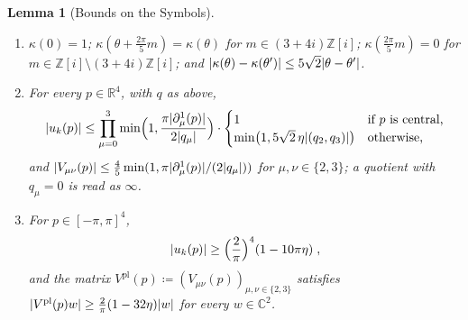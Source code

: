 \documentclass[11pt]{preprint}
\DeclarePairedDelimiter{\abs}{\lvert}{\rvert}
\numberwithin{equation}{section}
\newtheorem{lemma}[theorem]{Lemma}
\theoremstyle{definition}
\theoremstyle{remark}
\theoremstyle{plain}
\begin{document}
\begin{lemma}[Bounds on the Symbols]\label{lem:symbol-bounds}
\begin{enumerate}[label=(\roman*)]
\item $\kappa(0) = 1$; $\kappa(\theta + \frac{2\pi}{5}m) = \kappa(\theta)$ for $m \in (3 + 4i)\mathbb Z[i]$; $\kappa(\frac{2\pi}{5}m) = 0$ for $m \in \mathbb Z[i] \setminus (3 + 4i)\mathbb Z[i]$; and $\abs{\kappa(\theta) - \kappa(\theta')} \leq 5\sqrt2\abs{\theta - \theta'}$.
\item For every $p \in \mathbb R^4$, with $q$ as above,
\begin{equation}\label{eq:u-bound}
    \abs{u_k(p)} \leq \prod_{\mu=0}^{3}\min\Bigl(1, \frac{\pi\abs{\partial^1_\mu(p)}}{2\abs{q_\mu}}\Bigr) \cdot \begin{cases} 1 & \text{if } p \text{ is central,}\\ \min\bigl(1, 5\sqrt2\,\eta\abs{(q_2, q_3)}\bigr) & \text{otherwise,} \end{cases}
\end{equation}
and $\abs{V_{\mu\nu}(p)} \leq \frac45\min(1, \pi\abs{\partial^1_\mu(p)}/(2\abs{q_\mu}))$ for $\mu, \nu \in \{ 2, 3 \}$; a quotient with $q_\mu = 0$ is read as $\infty$.
\item For $p \in [-\pi, \pi]^4$,
\begin{equation}\label{eq:u-lower}
    \abs{u_k(p)} \geq \Bigl(\frac{2}{\pi}\Bigr)^4(1 - 10\pi\eta)\;,
\end{equation}
and the matrix $V^{\mathrm{pl}}(p) \coloneqq (V_{\mu\nu}(p))_{\mu,\nu \in \{ 2, 3 \}}$ satisfies $\abs{V^{\mathrm{pl}}(p)w} \geq \frac{2}{\pi}(1 - 32\eta)\abs{w}$ for every $w \in \mathbb C^2$.
\end{enumerate}
\end{lemma}
\end{document}

